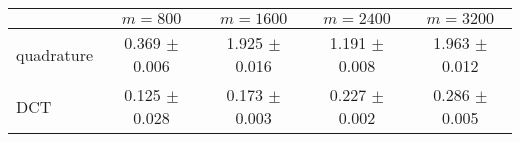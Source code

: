 \centering
\renewcommand{\arraystretch}{1.2}
\begin{tabular}{@{}lcccc@{}}
\toprule
 & $m=800$ & $m=1600$ & $m=2400$ & $m=3200$\\
\midrule
quadrature & 0.369 $\pm$ 0.006 & 1.925 $\pm$ 0.016 & 1.191 $\pm$ 0.008 & 1.963 $\pm$ 0.012 \\
DCT & 0.125 $\pm$ 0.028 & 0.173 $\pm$ 0.003 & 0.227 $\pm$ 0.002 & 0.286 $\pm$ 0.005 \\
\bottomrule
\end{tabular}
